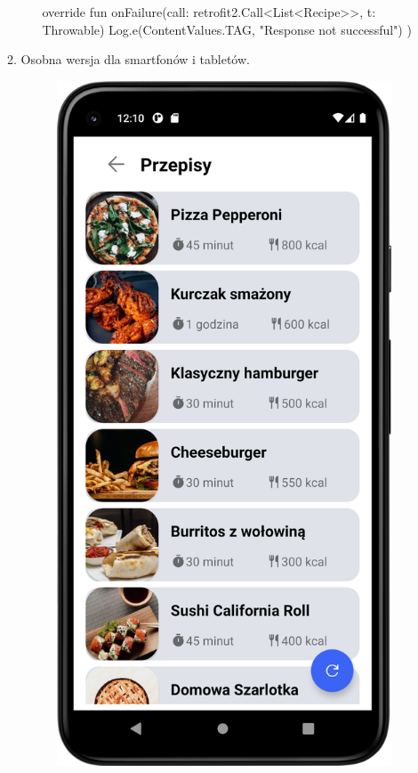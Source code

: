 \documentclass{article}
\begin{document}
\begin{enumerate}
\begin{enumerate}
\begin{enumerate}
\begin{mylisting}
{{        override fun onFailure(call: retrofit2.Call<List<Recipe>>, t: Throwable) {
            Log.e(ContentValues.TAG, "Response not successful")
        }
    })
}
\end{mylisting}

\end{enumerate}

\newpage
\item Osobna wersja dla smartfonów i tabletów.

\begin{figure}[ht]
    \centering
    \begin{minipage}[b]{0.4\textwidth}
        \centering
        \includegraphics[width=\textwidth]{../res/phone_list}

\end{minipage}
\end{figure}
\end{enumerate}
\end{enumerate}
\end{document}
